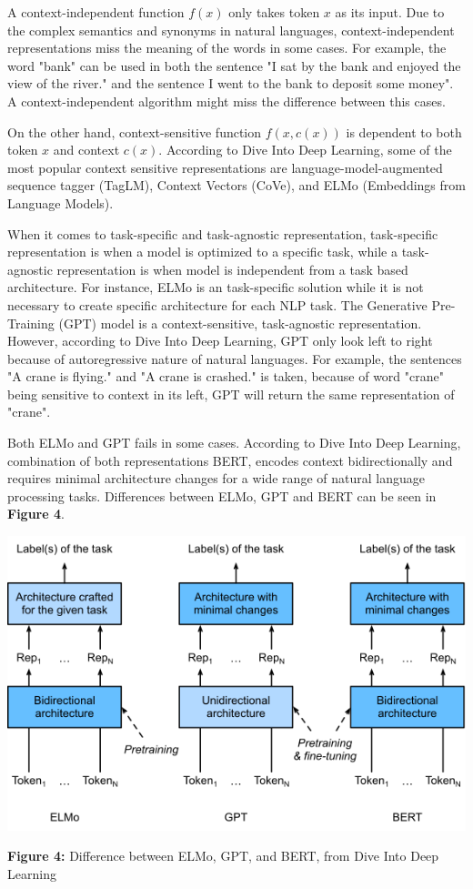 \documentclass[man]{apa7}
\begin{document}
A context-independent function $f(x)$ only takes token $x$ as its input. Due to the complex semantics and synonyms in natural languages, context-independent representations miss the meaning of the words in some cases. For example, the word "bank" can be used in both the sentence "I sat by the bank and enjoyed the view of the river." and the sentence I went to the bank to deposit some money". A context-independent algorithm might miss the difference between this cases.

On the other hand, context-sensitive function $f(x,c(x))$ is dependent to both token $x$ and context $c(x)$. According to Dive Into Deep Learning, some of the most popular context sensitive representations are language-model-augmented sequence tagger (TagLM), Context Vectors (CoVe), and ELMo (Embeddings from Language Models).

When it comes to task-specific and task-agnostic representation, task-specific representation is when a model is optimized to a specific task, while a task-agnostic representation is when model is independent from a task based architecture. For instance, ELMo is an task-specific solution while it is not necessary to create specific architecture for each NLP task. The Generative Pre-Training  (GPT) model is a context-sensitive, task-agnostic representation. However, according to Dive Into Deep Learning, GPT only look left to right because of autoregressive nature of natural languages. For example, the sentences "A crane is flying." and "A crane is crashed." is taken, because of word "crane" being sensitive to context in its left, GPT will return the same representation of "crane".

Both ELMo and GPT fails in some cases. According to Dive Into Deep Learning, combination of both representations BERT, encodes context bidirectionally and requires minimal architecture changes for a wide range of natural language processing tasks. Differences between ELMo, GPT and BERT can be seen in \textbf{Figure 4}.
\\[2\baselineskip]

\begin{center}
\includegraphics[scale=0.6]{elmo-gpt-bert.png}

\textbf{Figure 4:} Difference between ELMo, GPT, and BERT, from Dive Into Deep Learning\\[2\baselineskip]
\end{center}
\end{document}
